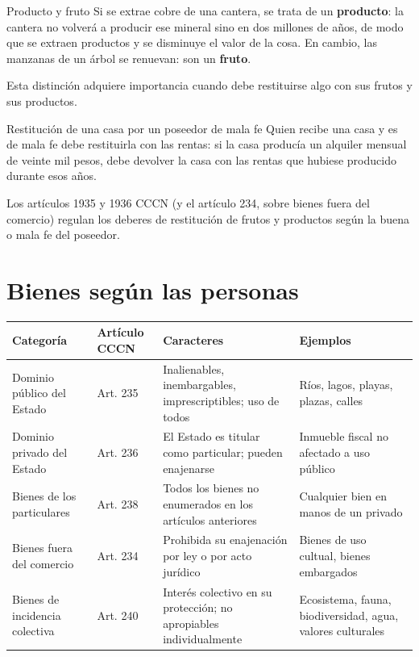 \documentclass[12pt,oneside]{book}
\newenvironment{tabla}{%
    \par\medskip\begingroup\small\renewcommand{\arraystretch}{1.3}\noindent\ignorespaces
}{%
    \par\endgroup\medskip
}
\begin{document}
\begin{example}{Producto y fruto}
Si se extrae cobre de una cantera, se trata de un \textbf{producto}: la cantera no volverá a producir ese mineral sino en dos millones de años, de modo que se extraen productos y se disminuye el valor de la cosa. En cambio, las manzanas de un árbol se renuevan: son un \textbf{fruto}.
\end{example}

Esta distinción adquiere importancia cuando debe restituirse algo con sus frutos y sus productos.

\begin{example}{Restitución de una casa por un poseedor de mala fe}
Quien recibe una casa y es de mala fe debe restituirla con las rentas: si la casa producía un alquiler mensual de veinte mil pesos, debe devolver la casa con las rentas que hubiese producido durante esos años.
\end{example}

Los artículos 1935 y 1936 CCCN (y el artículo 234, sobre bienes fuera del comercio) regulan los deberes de restitución de frutos y productos según la buena o mala fe del poseedor.

\section{Bienes según las personas}

\begin{tabla}
\begin{tabularx}{\textwidth}{B{2.9cm}P{1.7cm}YY}
\toprule
Categoría & \textbf{Artículo CCCN} & \textbf{Caracteres} & \textbf{Ejemplos} \\
\midrule
Dominio público del Estado & Art. 235 & Inalienables, inembargables, imprescriptibles; uso de todos & Ríos, lagos, playas, plazas, calles \\
Dominio privado del Estado & Art. 236 & El Estado es titular como particular; pueden enajenarse & Inmueble fiscal no afectado a uso público \\
Bienes de los particulares & Art. 238 & Todos los bienes no enumerados en los artículos anteriores & Cualquier bien en manos de un privado \\
Bienes fuera del comercio & Art. 234 & Prohibida su enajenación por ley o por acto jurídico & Bienes de uso cultual, bienes embargados \\
Bienes de incidencia colectiva & Art. 240 & Interés colectivo en su protección; no apropiables individualmente & Ecosistema, fauna, biodiversidad, agua, valores culturales \\
\bottomrule
\end{tabularx}
\end{tabla}
\end{document}
